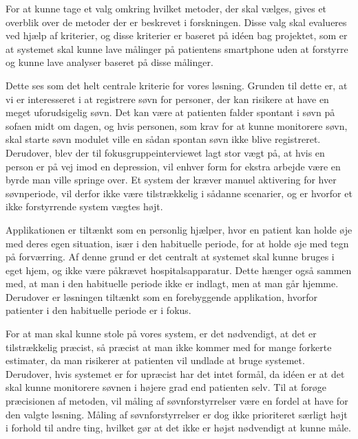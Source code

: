 For at kunne tage et valg omkring hvilket metoder, der skal vælges, gives et overblik over de metoder der er beskrevet i forskningen.
Disse valg skal evalueres ved hjælp af kriterier, og disse kriterier er baseret på idéen bag projektet, som er at systemet skal kunne lave målinger på patientens smartphone uden at forstyrre og kunne lave analyser baseret på disse målinger. 

\begin{description}[style=nextline]
\item[Kriterie \#1: Undgå brugerintervention og måle søvn uden at forstyrre]
Dette ses som det helt centrale kriterie for vores løsning.
Grunden til dette er, at vi er interesseret i at registrere søvn for personer, der kan risikere at have en meget uforudsigelig søvn. 
Det kan være at patienten falder spontant i søvn på sofaen midt om dagen, og hvis personen, som krav for at kunne monitorere søvn, skal starte søvn modulet ville en sådan spontan søvn ikke blive registreret.
Derudover, blev der til fokusgruppeinterviewet \citep[Kapitel 1, Sektion 5]{misc:faellesrapp} lagt stor vægt på, at hvis en person er på vej imod en depression, vil enhver form for ekstra arbejde være en byrde man ville springe over.
Et system der kræver manuel aktivering for hver søvnperiode, vil derfor ikke være tilstrækkelig i sådanne scenarier, og er hvorfor et ikke forstyrrende system vægtes højt.

\item[Kriterie \#2: Kunne bruges af patienter i deres eget hjem]
Applikationen er tiltænkt som en personlig hjælper, hvor en patient kan holde øje med deres egen situation, især i den habituelle periode, for at holde øje med tegn på forværring.
Af denne grund er det centralt at systemet skal kunne bruges i eget hjem, og ikke være påkrævet hospitalsapparatur.
Dette hænger også sammen med, at man i den habituelle periode ikke er indlagt, men at man går hjemme.
Derudover er løsningen tiltænkt som en forebyggende applikation, hvorfor patienter i den habituelle periode er i fokus.

\item[Kriterie \#3: Være præcis]
For at man skal kunne stole på vores system, er det nødvendigt, at det er tilstrækkelig præcist, så præcist at man ikke kommer med for mange forkerte estimater, da man risikerer at patienten vil undlade at bruge systemet. 
Derudover, hvis systemet er for upræcist har det intet formål, da idéen er at det skal kunne monitorere søvnen i højere grad end patienten selv.
Til at forøge præcisionen af metoden, vil måling af søvnforstyrrelser være en fordel at have for den valgte løsning.
Måling af søvnforstyrrelser er dog ikke prioriteret særligt højt i forhold til andre ting, hvilket gør at det ikke er højst nødvendigt at kunne måle.
\end{description}

